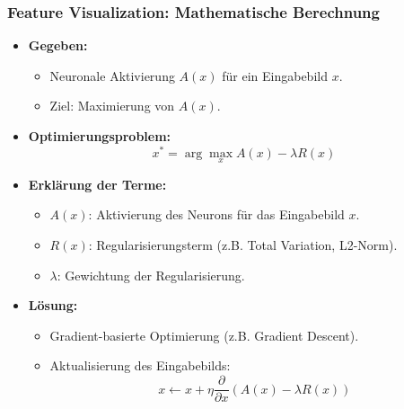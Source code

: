 \documentclass[aspectratio=1610, xcolor=dvipsnames, 9pt]{beamer}
\begin{document}
\begin{frame}
  \frametitle{Feature Visualization: Mathematische Berechnung}
  \begin{itemize}
    \item \textbf{Gegeben:}
    \begin{itemize}
      \item Neuronale Aktivierung $A(x)$ für ein Eingabebild $x$.
      \item Ziel: Maximierung von $A(x)$.
    \end{itemize}
    \item \textbf{Optimierungsproblem:}
    \[
    x^* = \arg\max_x A(x) - \lambda R(x)
    \]
    \item \textbf{Erklärung der Terme:}
    \begin{itemize}
      \item $A(x)$: Aktivierung des Neurons für das Eingabebild $x$.
      \item $R(x)$: Regularisierungsterm (z.B. Total Variation, L2-Norm).
      \item $\lambda$: Gewichtung der Regularisierung.
    \end{itemize}
    \item \textbf{Lösung:}
    \begin{itemize}
      \item Gradient-basierte Optimierung (z.B. Gradient Descent).
      \item Aktualisierung des Eingabebilds:
      \[
      x \leftarrow x + \eta \frac{\partial}{\partial x} \left( A(x) - \lambda R(x) \right)
      \]
    \end{itemize}
  \end{itemize}
\end{frame}
\end{document}
